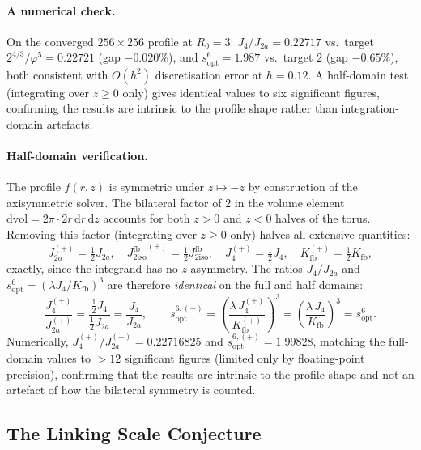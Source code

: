 \documentclass[11pt,a4paper]{article}
\newcommand{\vp}{\varphi}
\newcommand{\lam}{\lambda}
\newcommand{\Kfb}{K_{\mathrm{fb}}}
\newcommand{\Jfb}{J_{2\mathrm{iso}}^{\mathrm{fb}}}
\newcommand{\Ja}{J_{2a}}
\newcommand{\Jfour}{J_{4}}
\newcommand{\sopt}{s_{\mathrm{opt}}}
\theoremstyle{remark}
\begin{document}
\paragraph{A numerical check.}
On the converged $256\times256$ profile at $R_0=3$:
$\Jfour/\Ja = 0.22717$ vs.\ target $2^{4/3}/\vp^5=0.22721$ (gap $-0.020\%$),
and $\sopt^6 = 1.987$ vs.\ target $2$ (gap $-0.65\%$),
both consistent with $O(h^2)$ discretisation error at $h=0.12$.
A half-domain test (integrating over $z\geq 0$ only) gives identical
values to six significant figures, confirming the results are
intrinsic to the profile shape rather than integration-domain artefacts.

\paragraph{Half-domain verification.}
The profile $f(r,z)$ is symmetric under $z\mapsto-z$ by construction
of the axisymmetric solver.  The bilateral factor of $2$ in the
volume element $\mathrm{dvol} = 2\pi\cdot 2r\,\mathrm{d}r\,\mathrm{d}z$
accounts for both $z>0$ and $z<0$ halves of the torus.
Removing this factor (integrating over $z\geq 0$ only) halves
all extensive quantities:
\begin{equation}
  \Ja^{(+)} = \tfrac{1}{2}\Ja, \quad
  {\Jfb}^{(+)} = \tfrac{1}{2}\Jfb, \quad
  \Jfour^{(+)} = \tfrac{1}{2}\Jfour, \quad
  \Kfb^{(+)} = \tfrac{1}{2}\Kfb,
\end{equation}
exactly, since the integrand has no $z$-asymmetry.
The ratios $\Jfour/\Ja$ and $\sopt^6 = (\lam\Jfour/\Kfb)^3$
are therefore \emph{identical} on the full and half domains:
\begin{equation}
  \frac{\Jfour^{(+)}}{\Ja^{(+)}}
  = \frac{\tfrac{1}{2}\Jfour}{\tfrac{1}{2}\Ja}
  = \frac{\Jfour}{\Ja},
  \qquad
  \sopt^{6,(+)} = \left(\frac{\lam\,\Jfour^{(+)}}{\Kfb^{(+)}}\right)^3
  = \left(\frac{\lam\,\Jfour}{\Kfb}\right)^3 = \sopt^6.
\end{equation}
Numerically, $\Jfour^{(+)}/\Ja^{(+)} = 0.22716825$ and
$\sopt^{6,(+)} = 1.99828$, matching the full-domain values
to $>12$ significant figures (limited only by floating-point
precision), confirming that the results are intrinsic to the
profile shape and not an artefact of how the bilateral symmetry
is counted.

\subsection{The Linking Scale Conjecture}
\label{P2:sec:lslc}
\end{document}
